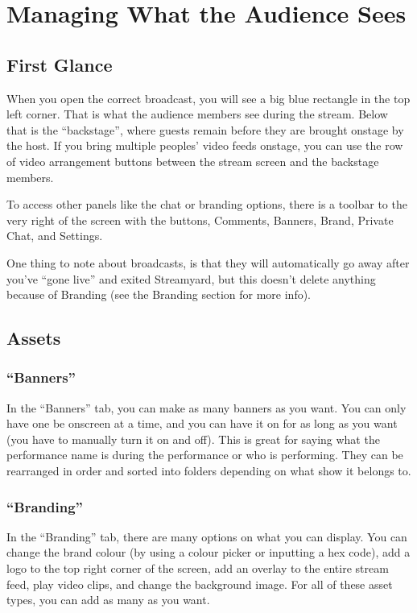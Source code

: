 \documentclass{article}
\begin{document}
\section{Managing What the Audience Sees}
\subsection{First Glance}
When you open the correct broadcast, you will see a big blue rectangle in the top left corner. That is what the audience members see during the stream. Below that is the “backstage”, where guests remain before they are brought onstage by the host. If you bring multiple peoples’ video feeds onstage, you can use the row of video arrangement buttons between the stream screen and the backstage members.

To access other panels like the chat or branding options, there is a toolbar to the very right of the screen with the buttons, Comments, Banners, Brand, Private Chat, and Settings.

One thing to note about broadcasts, is that they will automatically go away after you’ve “gone live” and exited Streamyard, but this doesn’t delete anything because of Branding (see the Branding section for more info).

\subsection{Assets}
\subsubsection{``Banners''}
In the “Banners” tab, you can make as many banners as you want. You can only have one be onscreen at a time, and you can have it on for as long as you want (you have to manually turn it on and off). This is great for saying what the performance name is during the performance or who is performing. They can be rearranged in order and sorted into folders depending on what show it belongs to.

\subsubsection{``Branding''}
In the “Branding” tab, there are many options on what you can display. You can change the brand colour (by using a colour picker or inputting a hex code), add a logo to the top right corner of the screen, add an overlay to the entire stream feed, play video clips, and change the background image. For all of these asset types, you can add as many as you want.
\end{document}
